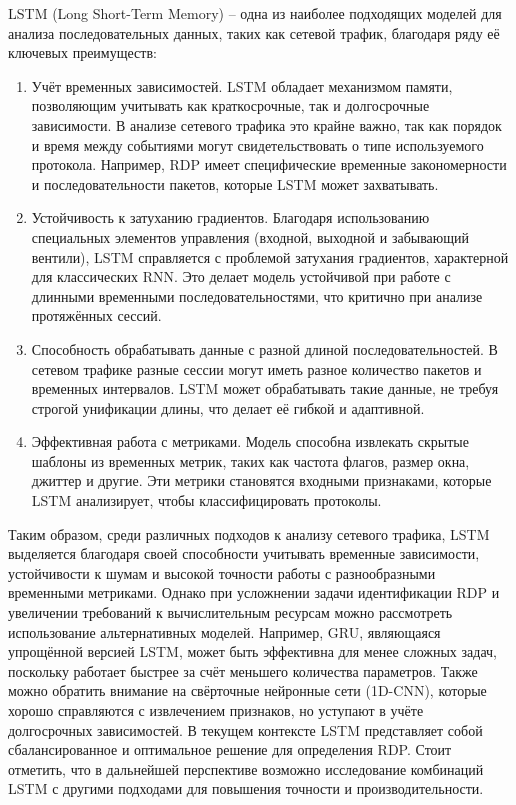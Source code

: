 \documentclass[spec, och, diploma]{SCWorks}
\begin{document}
  LSTM (Long Short-Term Memory) -- одна из наиболее подходящих моделей для анализа последовательных данных, таких как 
  сетевой трафик, благодаря ряду её ключевых преимуществ: 

  \begin{enumerate}
    \item Учёт временных зависимостей. LSTM обладает механизмом памяти, позволяющим учитывать как краткосрочные, так и 
    долгосрочные зависимости. В анализе сетевого трафика это крайне важно, так как порядок и время между событиями могут 
    свидетельствовать о типе используемого протокола. Например, RDP имеет специфические временные закономерности и последовательности пакетов, 
    которые LSTM может захватывать.  

    \item Устойчивость к затуханию градиентов. Благодаря использованию специальных элементов управления (входной, выходной и забывающий вентили), 
    LSTM справляется с проблемой затухания градиентов, характерной для классических RNN. Это делает модель устойчивой при работе с длинными 
    временными последовательностями, что критично при анализе протяжённых сессий.  

    \item Способность обрабатывать данные с разной длиной последовательностей. В сетевом трафике разные сессии могут иметь разное количество
    пакетов и временных интервалов. LSTM может обрабатывать такие данные, не требуя строгой унификации длины, что делает её гибкой и адаптивной.  

    \item Эффективная работа с метриками. Модель способна извлекать скрытые шаблоны из временных метрик, таких как частота флагов, 
    размер окна, джиттер и другие. Эти метрики становятся входными признаками, которые LSTM анализирует, чтобы классифицировать протоколы.  

  \end{enumerate}

  Таким образом, среди различных подходов к анализу сетевого трафика, LSTM выделяется благодаря своей способности учитывать временные 
  зависимости, устойчивости к шумам и высокой точности работы с разнообразными временными метриками. Однако при усложнении задачи 
  идентификации RDP и увеличении требований к вычислительным ресурсам можно рассмотреть использование альтернативных моделей. 
  Например, GRU, являющаяся упрощённой версией LSTM, может быть эффективна для менее сложных задач, поскольку работает быстрее 
  за счёт меньшего количества параметров. Также можно обратить внимание на свёрточные нейронные сети (1D-CNN), которые хорошо 
  справляются с извлечением признаков, но уступают в учёте долгосрочных зависимостей. В текущем контексте LSTM представляет собой 
  сбалансированное и оптимальное решение для определения RDP. Стоит отметить, что в дальнейшей перспективе возможно 
  исследование комбинаций LSTM с другими подходами для повышения точности и производительности.
\end{document}

